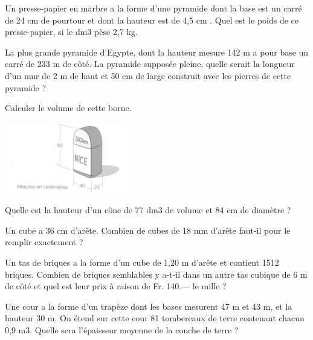 \begin{exercice}
Un presse-papier en marbre a la forme d’une pyramide dont la base est un carré de 24 cm de pourtour et dont la hauteur est de 4,5 cm . Quel est le poids de ce presse-papier, si le dm3 pèse 2,7 kg.
\end{exercice}

\begin{exercice}
La plus grande pyramide d’Egypte, dont la hauteur mesure 142 m a pour base un carré de 233 m de côté. La pyramide supposée pleine, quelle serait la longueur d’un mur de 2 m de haut et 50 cm de large construit avec les pierres de cette pyramide ?
\end{exercice}

\begin{exercice}
Calculer le volume de cette borne. 
\begin{center}
\includegraphics[width= 0.4\textwidth]{volume/image/volume4.png}
\end{center}
\end{exercice}

\begin{exercice}
Quelle est la hauteur d’un cône de 77 dm3 de volume et 84 cm de diamètre ? 
\end{exercice}

\begin{exercice}
Un cube a 36 cm d’arête. Combien de cubes de 18 mm d’arête faut-il pour le remplir exactement ?
\end{exercice}

\begin{exercice}
Un tas de briques a la forme d’un cube de 1,20 m d’arête et contient 1512 briques. Combien de briques semblables y a-t-il dans un autre tas cubique de 6 m de côté et quel est leur prix à raison de Fr. 140.— le mille ?
\end{exercice}

\begin{exercice}
Une cour a la forme d’un trapèze dont les bases mesurent 47 m et 43 m, et la hauteur 30 m. On étend sur cette cour 81 tombereaux de terre contenant chacun 0,9 m3. Quelle sera l’épaisseur moyenne de la couche de terre ?
\end{exercice}

